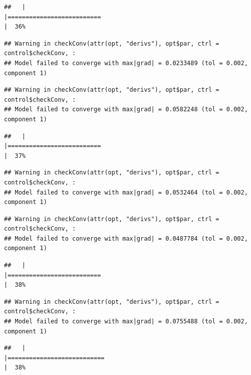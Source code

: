 \documentclass[
  12pt,
]{book}
\begin{document}
\begin{verbatim}
##   |                                                                              |==========================                                            |  36%
\end{verbatim}

\begin{verbatim}
## Warning in checkConv(attr(opt, "derivs"), opt$par, ctrl = control$checkConv, :
## Model failed to converge with max|grad| = 0.0233489 (tol = 0.002, component 1)
\end{verbatim}

\begin{verbatim}
## Warning in checkConv(attr(opt, "derivs"), opt$par, ctrl = control$checkConv, :
## Model failed to converge with max|grad| = 0.0582248 (tol = 0.002, component 1)
\end{verbatim}

\begin{verbatim}
##   |                                                                              |==========================                                            |  37%
\end{verbatim}

\begin{verbatim}
## Warning in checkConv(attr(opt, "derivs"), opt$par, ctrl = control$checkConv, :
## Model failed to converge with max|grad| = 0.0532464 (tol = 0.002, component 1)
\end{verbatim}

\begin{verbatim}
## Warning in checkConv(attr(opt, "derivs"), opt$par, ctrl = control$checkConv, :
## Model failed to converge with max|grad| = 0.0487784 (tol = 0.002, component 1)
\end{verbatim}

\begin{verbatim}
##   |                                                                              |==========================                                            |  38%
\end{verbatim}

\begin{verbatim}
## Warning in checkConv(attr(opt, "derivs"), opt$par, ctrl = control$checkConv, :
## Model failed to converge with max|grad| = 0.0755488 (tol = 0.002, component 1)
\end{verbatim}

\begin{verbatim}
##   |                                                                              |===========================                                           |  38%
\end{verbatim}
\end{document}
